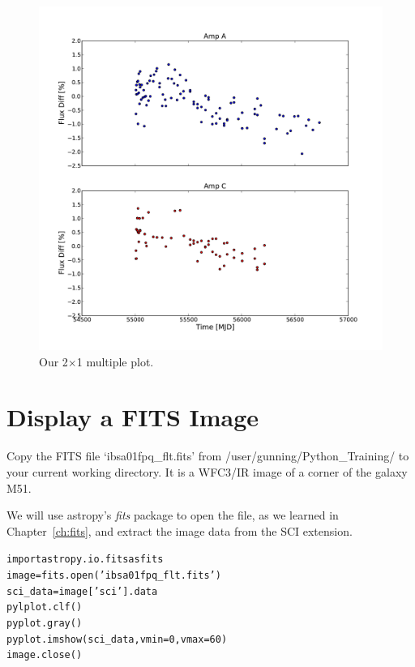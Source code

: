 \begin{figure}[tbp]
  \centering
    \includegraphics[scale=0.35]{flux_vs_time_4.pdf}
    \caption{Our 2$\times$1 multiple plot.}
  \label{fig:flux_vs_time_4}
\end{figure}


\section{Display a FITS Image}

Copy the FITS file `ibsa01fpq\_flt.fits' from /user/gunning/Python\_Training/ to your current working directory. It
is a WFC3/IR image of a corner of the galaxy M51.

We will use astropy's \textit{fits} package to open the file, as we learned in Chapter~\ref{ch:fits},
and extract the image data from the SCI extension.  

\begin{alltt}
\pytab import astropy.io.fits as fits
\pytab image = fits.open('ibsa01fpq_flt.fits')
\pytab sci_data = image['sci'].data
\pytab pylplot.clf()
\pytab pyplot.gray()
\pytab pyplot.imshow(sci_data, vmin=0, vmax=60)
\pytab image.close()
\end{alltt}

